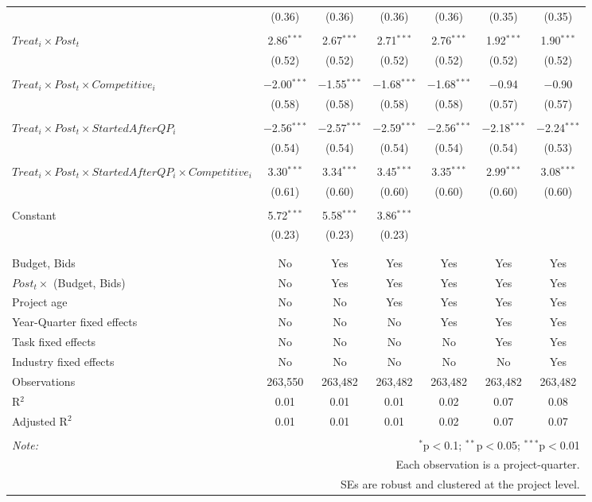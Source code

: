 \documentclass[
]{article}
\begin{document}
\begin{table}[H]
\begin{tabular}{@{\extracolsep{-3pt}}lcccccc}
  & (0.36) & (0.36) & (0.36) & (0.36) & (0.35) & (0.35) \\ 
  & & & & & & \\ 
 $Treat_i \times Post_t$ & 2.86$^{***}$ & 2.67$^{***}$ & 2.71$^{***}$ & 2.76$^{***}$ & 1.92$^{***}$ & 1.90$^{***}$ \\ 
  & (0.52) & (0.52) & (0.52) & (0.52) & (0.52) & (0.52) \\ 
  & & & & & & \\ 
 $Treat_i \times Post_t \times Competitive_i$ & $-$2.00$^{***}$ & $-$1.55$^{***}$ & $-$1.68$^{***}$ & $-$1.68$^{***}$ & $-$0.94 & $-$0.90 \\ 
  & (0.58) & (0.58) & (0.58) & (0.58) & (0.57) & (0.57) \\ 
  & & & & & & \\ 
 $Treat_i \times Post_t \times StartedAfterQP_i$ & $-$2.56$^{***}$ & $-$2.57$^{***}$ & $-$2.59$^{***}$ & $-$2.56$^{***}$ & $-$2.18$^{***}$ & $-$2.24$^{***}$ \\ 
  & (0.54) & (0.54) & (0.54) & (0.54) & (0.54) & (0.53) \\ 
  & & & & & & \\ 
 $Treat_i \times Post_t \times StartedAfterQP_i \times Competitive_i$ & 3.30$^{***}$ & 3.34$^{***}$ & 3.45$^{***}$ & 3.35$^{***}$ & 2.99$^{***}$ & 3.08$^{***}$ \\ 
  & (0.61) & (0.60) & (0.60) & (0.60) & (0.60) & (0.60) \\ 
  & & & & & & \\ 
 Constant & 5.72$^{***}$ & 5.58$^{***}$ & 3.86$^{***}$ &  &  &  \\ 
  & (0.23) & (0.23) & (0.23) &  &  &  \\ 
  & & & & & & \\ 
\hline \\[-1.8ex] 
Budget, Bids & No & Yes & Yes & Yes & Yes & Yes \\ 
$Post_t \times $  (Budget, Bids) & No & Yes & Yes & Yes & Yes & Yes \\ 
Project age & No & No & Yes & Yes & Yes & Yes \\ 
Year-Quarter fixed effects & No & No & No & Yes & Yes & Yes \\ 
Task fixed effects & No & No & No & No & Yes & Yes \\ 
Industry fixed effects & No & No & No & No & No & Yes \\ 
Observations & 263,550 & 263,482 & 263,482 & 263,482 & 263,482 & 263,482 \\ 
R$^{2}$ & 0.01 & 0.01 & 0.01 & 0.02 & 0.07 & 0.08 \\ 
Adjusted R$^{2}$ & 0.01 & 0.01 & 0.01 & 0.02 & 0.07 & 0.07 \\ 
\hline 
\hline \\[-1.8ex] 
\textit{Note:}  & \multicolumn{6}{r}{$^{*}$p$<$0.1; $^{**}$p$<$0.05; $^{***}$p$<$0.01} \\ 
 & \multicolumn{6}{r}{Each observation is a project-quarter.} \\ 
 & \multicolumn{6}{r}{SEs are robust and clustered at the project level.} \\ 
\end{tabular} 
\end{table}
\end{document}
